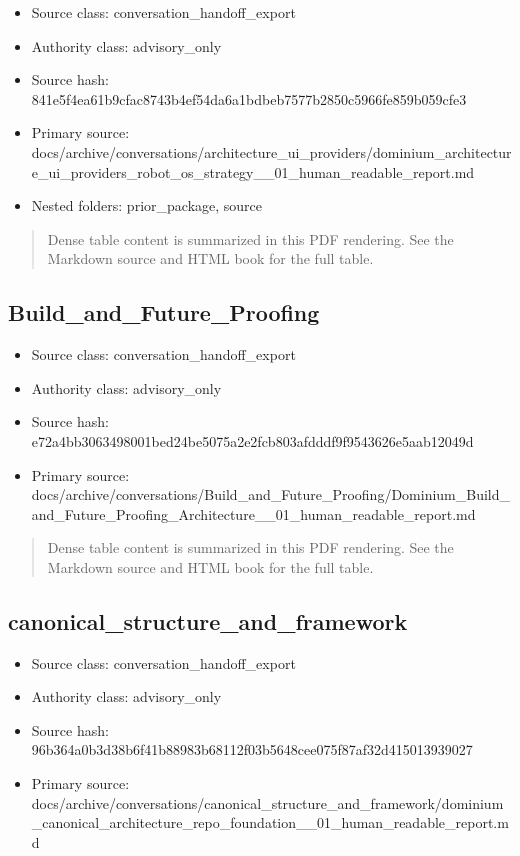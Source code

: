 \documentclass[11pt,a4paper]{report}
\begin{document}
\begin{itemize}
\item Source class: conversation\_handoff\_export
\item Authority class: advisory\_only
\item Source hash: 841e5f4ea61b9cfac8743b4ef54da6a1bdbeb7577b2850c5966fe859b059cfe3
\item Primary source: docs/archive/conversations/architecture\_ui\_providers/dominium\_architecture\_ui\_providers\_robot\_os\_strategy\_\_01\_human\_readable\_report.md
\item Nested folders: prior\_package, source
\end{itemize}

\begin{quote}\small Dense table content is summarized in this PDF rendering. See the Markdown source and HTML book for the full table.\end{quote}

\subsection{Build\_and\_Future\_Proofing}

\begin{itemize}
\item Source class: conversation\_handoff\_export
\item Authority class: advisory\_only
\item Source hash: e72a4bb3063498001bed24be5075a2e2fcb803afdddf9f9543626e5aab12049d
\item Primary source: docs/archive/conversations/Build\_and\_Future\_Proofing/Dominium\_Build\_and\_Future\_Proofing\_Architecture\_\_01\_human\_readable\_report.md
\end{itemize}

\begin{quote}\small Dense table content is summarized in this PDF rendering. See the Markdown source and HTML book for the full table.\end{quote}

\subsection{canonical\_structure\_and\_framework}

\begin{itemize}
\item Source class: conversation\_handoff\_export
\item Authority class: advisory\_only
\item Source hash: 96b364a0b3d38b6f41b88983b68112f03b5648cee075f87af32d415013939027
\item Primary source: docs/archive/conversations/canonical\_structure\_and\_framework/dominium\_canonical\_architecture\_repo\_foundation\_\_01\_human\_readable\_report.md
\end{itemize}
\end{document}
